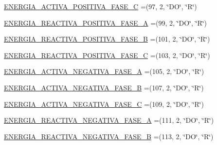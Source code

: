 \begin{DoxyCompactItemize}
\item 
\hyperlink{enumcom_1_1eneri_1_1scorpio__metertool_1_1devices_1_1_register_aa29e3992aca616be962970e9cfd69c5e}{E\+N\+E\+R\+G\+I\+A\+\_\+\+A\+C\+T\+I\+V\+A\+\_\+\+P\+O\+S\+I\+T\+I\+V\+A\+\_\+\+F\+A\+S\+E\+\_\+C} =(97, 2, \char`\"{}DO\char`\"{}, \char`\"{}R\char`\"{})
\item 
\hyperlink{enumcom_1_1eneri_1_1scorpio__metertool_1_1devices_1_1_register_af8103ad502e0561bb3830cedc03121b8}{E\+N\+E\+R\+G\+I\+A\+\_\+\+R\+E\+A\+C\+T\+I\+V\+A\+\_\+\+P\+O\+S\+I\+T\+I\+V\+A\+\_\+\+F\+A\+S\+E\+\_\+A} =(99, 2, \char`\"{}DO\char`\"{}, \char`\"{}R\char`\"{})
\item 
\hyperlink{enumcom_1_1eneri_1_1scorpio__metertool_1_1devices_1_1_register_ae5029b12873cf08f063426bb435ad4cc}{E\+N\+E\+R\+G\+I\+A\+\_\+\+R\+E\+A\+C\+T\+I\+V\+A\+\_\+\+P\+O\+S\+I\+T\+I\+V\+A\+\_\+\+F\+A\+S\+E\+\_\+B} =(101, 2, \char`\"{}DO\char`\"{}, \char`\"{}R\char`\"{})
\item 
\hyperlink{enumcom_1_1eneri_1_1scorpio__metertool_1_1devices_1_1_register_af09417074fd150101873201874ebc4aa}{E\+N\+E\+R\+G\+I\+A\+\_\+\+R\+E\+A\+C\+T\+I\+V\+A\+\_\+\+P\+O\+S\+I\+T\+I\+V\+A\+\_\+\+F\+A\+S\+E\+\_\+C} =(103, 2, \char`\"{}DO\char`\"{}, \char`\"{}R\char`\"{})
\item 
\hyperlink{enumcom_1_1eneri_1_1scorpio__metertool_1_1devices_1_1_register_ad8e92f2a7bff080ab68cafb2713aec69}{E\+N\+E\+R\+G\+I\+A\+\_\+\+A\+C\+T\+I\+V\+A\+\_\+\+N\+E\+G\+A\+T\+I\+V\+A\+\_\+\+F\+A\+S\+E\+\_\+A} =(105, 2, \char`\"{}DO\char`\"{}, \char`\"{}R\char`\"{})
\item 
\hyperlink{enumcom_1_1eneri_1_1scorpio__metertool_1_1devices_1_1_register_abb2444e66577076ee8379e3eecbc0d9b}{E\+N\+E\+R\+G\+I\+A\+\_\+\+A\+C\+T\+I\+V\+A\+\_\+\+N\+E\+G\+A\+T\+I\+V\+A\+\_\+\+F\+A\+S\+E\+\_\+B} =(107, 2, \char`\"{}DO\char`\"{}, \char`\"{}R\char`\"{})
\item 
\hyperlink{enumcom_1_1eneri_1_1scorpio__metertool_1_1devices_1_1_register_acfe9e86fdb514c1e1eaa02a5b8284ce1}{E\+N\+E\+R\+G\+I\+A\+\_\+\+A\+C\+T\+I\+V\+A\+\_\+\+N\+E\+G\+A\+T\+I\+V\+A\+\_\+\+F\+A\+S\+E\+\_\+C} =(109, 2, \char`\"{}DO\char`\"{}, \char`\"{}R\char`\"{})
\item 
\hyperlink{enumcom_1_1eneri_1_1scorpio__metertool_1_1devices_1_1_register_a85b8467a5906f5659c8f7defc27f534f}{E\+N\+E\+R\+G\+I\+A\+\_\+\+R\+E\+A\+C\+T\+I\+V\+A\+\_\+\+N\+E\+G\+A\+T\+I\+V\+A\+\_\+\+F\+A\+S\+E\+\_\+A} =(111, 2, \char`\"{}DO\char`\"{}, \char`\"{}R\char`\"{})
\item 
\hyperlink{enumcom_1_1eneri_1_1scorpio__metertool_1_1devices_1_1_register_a6e694f284a821801e65ea86bd095075b}{E\+N\+E\+R\+G\+I\+A\+\_\+\+R\+E\+A\+C\+T\+I\+V\+A\+\_\+\+N\+E\+G\+A\+T\+I\+V\+A\+\_\+\+F\+A\+S\+E\+\_\+B} =(113, 2, \char`\"{}DO\char`\"{}, \char`\"{}R\char`\"{})

\end{DoxyCompactItemize}
